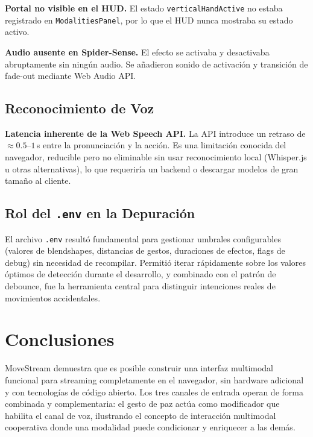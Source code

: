 \documentclass[11pt]{article}
\begin{document}
\textbf{Portal no visible en el HUD.} El estado \texttt{verticalHandActive} no estaba registrado en \texttt{ModalitiesPanel}, por lo que el HUD nunca mostraba su estado activo.

\textbf{Audio ausente en Spider-Sense.} El efecto se activaba y desactivaba abruptamente sin ningún audio. Se añadieron sonido de activación y transición de fade-out mediante Web Audio API.

\subsection{Reconocimiento de Voz}

\textbf{Latencia inherente de la Web Speech API.} La API introduce un retraso de $\approx 0.5$--$1\,$s entre la pronunciación y la acción. Es una limitación conocida del navegador, reducible pero no eliminable sin usar reconocimiento local (Whisper.js u otras alternativas), lo que requeriría un backend o descargar modelos de gran tamaño al cliente.

\subsection{Rol del \texttt{.env} en la Depuración}

El archivo \texttt{.env} resultó fundamental para gestionar umbrales configurables (valores de blendshapes, distancias de gestos, duraciones de efectos, flags de debug) sin necesidad de recompilar. Permitió iterar rápidamente sobre los valores óptimos de detección durante el desarrollo, y combinado con el patrón de debounce, fue la herramienta central para distinguir intenciones reales de movimientos accidentales.

\section{Conclusiones}

MoveStream demuestra que es posible construir una interfaz multimodal funcional para streaming completamente en el navegador, sin hardware adicional y con tecnologías de código abierto. Los tres canales de entrada operan de forma combinada y complementaria: el gesto de paz actúa como modificador que habilita el canal de voz, ilustrando el concepto de interacción multimodal cooperativa donde una modalidad puede condicionar y enriquecer a las demás.
\end{document}
